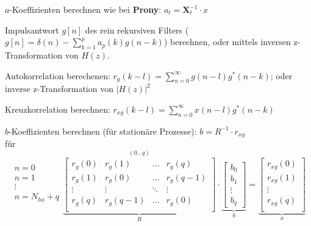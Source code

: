 \begin{aufzaehlung}
  		\item $a$-Koeffizienten berechnen wie bei \textbf{Prony}: $a_t = \bm X_t^{-1} \cdot x$   
  		\item Impulsantwort $g[n]$ des rein rekursiven Filters ($g[n] = \delta(n)- \sum\limits_{k=1}^p a_p(k)g(n-k)$) berechnen, 
  		oder mittels inversen z-Transformation von $H(z)$.
  		\item Autokorrelation berechenen:  $r_g(k-l)=\sum\limits_{n=0}^\infty g(n-l)g^*(n-k)$; oder inverse z-Transformation von $|H(z)|^2$
  		\item Kreuzkorrelation berechnen: $r_{xg}(k-l)=\sum\limits_{n=0}^\infty x(n-l)g^*(n-k)$
  		\item $b$-Koeffizienten berechnen (für stationäre Prozesse): $b = R^{-1} \cdot r_{xg}$ \\
  		für\\
  		
			
		 $$\begin{matrix}n=0\\ n=1\\ \vdots\\ n=N_{ha}+q\\ \end{matrix}
		\overset{(0 \hdots q)}{\underbrace{\begin{bmatrix}
    		r_g(0) & r_g(1) & \hdots & r_g(q) \\                                            
    		r_g(1) & r_g(0) & \hdots & r_g(q-1) \\         
    		\vdots & \vdots & \ddots & \vdots \\                                      
    		r_g(q) &r_g(q-1) & \hdots & r_g(0) \\    
		\end{bmatrix}  }_{R}} \cdot \underbrace{\begin{bmatrix}
    		b_0 \\
    		b_1 \\
    		\vdots \\
    		b_q
		\end{bmatrix}  }_{b}= \underbrace{\begin{bmatrix}
    		r_{xg}(0) \\
    		r_{xg}(1) \\
    		\vdots \\
    		r_{xg}(q) \\
		\end{bmatrix}  }_{x} $$   \normalsize
\end{aufzaehlung}

